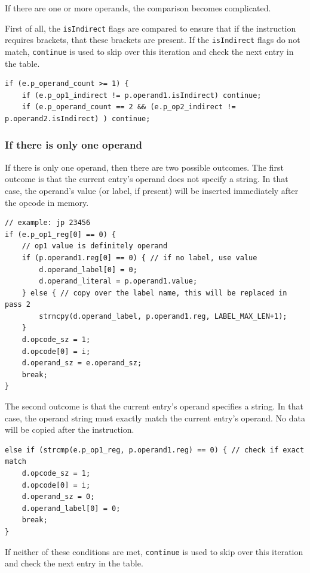 \documentclass[a4paper]{report}
\begin{document}
If there are one or more operands, the comparison becomes complicated.

First of all, the \texttt{isIndirect} flags are compared to ensure that if the
instruction requires brackets, that these brackets are present. If the
\texttt{isIndirect} flags do not match, \texttt{continue} is used to skip over
this iteration and check the next entry in the table.

\begin{lstlisting}
if (e.p_operand_count >= 1) {
	if (e.p_op1_indirect != p.operand1.isIndirect) continue;
	if (e.p_operand_count == 2 && (e.p_op2_indirect != p.operand2.isIndirect) ) continue;
\end{lstlisting}

\subsubsection{If there is only one operand}

If there is only one operand, then there are two possible outcomes. The first
outcome is that the current entry's operand does not specify a string. In that
case, the operand's value (or label, if present) will be inserted immediately
after the opcode in memory.

\begin{lstlisting}
// example: jp 23456
if (e.p_op1_reg[0] == 0) {
	// op1 value is definitely operand
	if (p.operand1.reg[0] == 0) { // if no label, use value
		d.operand_label[0] = 0;
		d.operand_literal = p.operand1.value;
	} else { // copy over the label name, this will be replaced in pass 2
		strncpy(d.operand_label, p.operand1.reg, LABEL_MAX_LEN+1);
	}
	d.opcode_sz = 1;
	d.opcode[0] = i;
	d.operand_sz = e.operand_sz;
	break;
}
\end{lstlisting}

The second outcome is that the current entry's operand specifies a string. In
that case, the operand string must exactly match the current entry's operand. No
data will be copied after the instruction.

\begin{lstlisting}
else if (strcmp(e.p_op1_reg, p.operand1.reg) == 0) { // check if exact match
	d.opcode_sz = 1;
	d.opcode[0] = i;
	d.operand_sz = 0;
	d.operand_label[0] = 0;
	break;
}
\end{lstlisting}

If neither of these conditions are met, \texttt{continue} is used to skip over
this iteration and check the next entry in the table.
\end{document}
